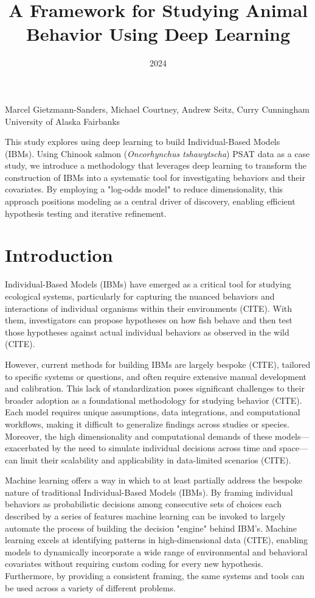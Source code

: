 \documentclass[11pt]{article}
\title{A Framework for Studying Animal Behavior Using Deep Learning}
\date{2024}
\makeatletter
\renewcommand{\maketitle}{
\begin{center}

\pagestyle{empty}

{\LARGE \bf \@title\par}
\vspace{1cm}

{\Large Marcel Gietzmann-Sanders, Michael Courtney, Andrew Seitz, Curry Cunningham}\\[1cm]

University of Alaska Fairbanks


\end{center}
}\makeatother
\makeatother
\begin{document}
\maketitle


\begin{center}
This study explores using deep learning to build Individual-Based Models (IBMs). Using Chinook salmon (\textit{Oncorhynchus tshawytscha}) PSAT data as a case study, we introduce a methodology that leverages deep learning to transform the construction of IBMs into a systematic tool for investigating behaviors and their covariates. By employing a "log-odds model" to reduce dimensionality, this approach positions modeling as a central driver of discovery, enabling efficient hypothesis testing and iterative refinement.
\end{center}



\section*{Introduction}

Individual-Based Models (IBMs) have emerged as a critical tool for studying ecological systems, particularly for capturing the nuanced behaviors and interactions of individual organisms within their environments (CITE). With them, investigators can propose hypotheses on how fish behave and then test those hypotheses against actual individual behaviors as observed in the wild (CITE).

However, current methods for building IBMs are largely bespoke (CITE), tailored to specific systems or questions, and often require extensive manual development and calibration. This lack of standardization poses significant challenges to their broader adoption as a foundational methodology for studying behavior (CITE). Each model requires unique assumptions, data integrations, and computational workflows, making it difficult to generalize findings across studies or species. Moreover, the high dimensionality and computational demands of these models—exacerbated by the need to simulate individual decisions across time and space—can limit their scalability and applicability in data-limited scenarios (CITE).

Machine learning offers a way in which to at least partially address the bespoke nature of traditional Individual-Based Models (IBMs). By framing individual behaviors as probabilistic decisions among consecutive sets of choices each described by a series of features machine learning can be invoked to largely automate the process of building the decision "engine" behind IBM's. Machine learning excels at identifying patterns in high-dimensional data (CITE), enabling models to dynamically incorporate a wide range of environmental and behavioral covariates without requiring custom coding for every new hypothesis. Furthermore, by providing a consistent framing, the same systems and tools can be used across a variety of different problems. 
\end{document}
